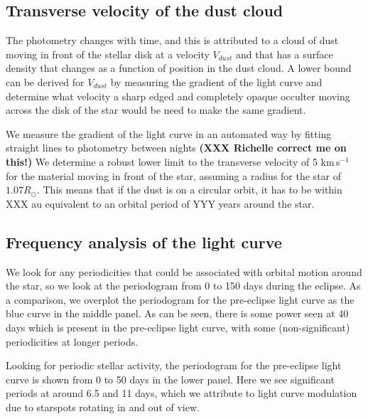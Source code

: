 \documentclass{aa}
\begin{document}
\subsection{Transverse velocity of the dust cloud}

The photometry changes with time, and this is attributed to a cloud of dust moving in front of the stellar disk at a velocity $V_{dust}$ and that has a surface density that changes as a function of position in the dust cloud.
%
A lower bound can be derived for $V_{dust}$ by measuring the gradient of the light curve and determine what velocity a sharp edged and completely opaque occulter moving across the disk of the star would be need to make the same gradient.

We measure the gradient of the light curve in an automated way by fitting straight lines to photometry between nights {\bf (XXX Richelle correct me on this!)}
%
We determine a robust lower limit to the transverse velocity of 5 km\,s$^{-1}$ for the material moving in front of the star, assuming a radius for the star of $1.07 R_\odot$.
%
This means that if the dust is on a circular orbit, it has to be within XXX au equivalent to an orbital period of YYY years around the star.

\subsection{Frequency analysis of the light curve}

%
%
We look for any periodicities that could be associated with orbital motion around the star, so we look at the periodogram from 0 to 150 days during the eclipse.
%
As a comparison, we overplot the periodogram for the pre-eclipse light curve as the blue curve in the middle panel. 
%
As can be seen, there is some power seen at 40 days which is present in the pre-eclipse light curve, with some (non-significant) periodicities at longer periods.

Looking for periodic stellar activity, the periodogram for the pre-eclipse light curve is shown from 0 to 50 days in the lower panel.
%
Here we see significant periods at around 6.5 and 11 days, which we attribute to light curve modulation due to starspots rotating in and out of view. 
\end{document}
